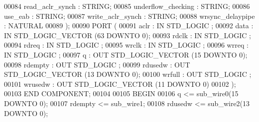 \begin{DoxyCode}
{00084         read\_aclr\_synch     : \textcolor{comment}{STRING};
00085         underflow\_checking      : \textcolor{comment}{STRING};
00086         use\_eab     : \textcolor{comment}{STRING};
00087         write\_aclr\_synch        : \textcolor{comment}{STRING};
00088         wrsync\_delaypipe        : \textcolor{comment}{NATURAL}
00089     );
00090     \textcolor{keywordflow}{PORT} (
00091             aclr    : \textcolor{keywordflow}{IN} \textcolor{comment}{STD\_LOGIC} ;
00092             data    : \textcolor{keywordflow}{IN} \textcolor{comment}{STD\_LOGIC\_VECTOR} (\textcolor{vhdllogic}{}\textcolor{vhdllogic}{63} \textcolor{keywordflow}{DOWNTO} \textcolor{vhdllogic}{}\textcolor{vhdllogic}{0});
00093             rdclk   : \textcolor{keywordflow}{IN} \textcolor{comment}{STD\_LOGIC} ;
00094             rdreq   : \textcolor{keywordflow}{IN} \textcolor{comment}{STD\_LOGIC} ;
00095             wrclk   : \textcolor{keywordflow}{IN} \textcolor{comment}{STD\_LOGIC} ;
00096             wrreq   : \textcolor{keywordflow}{IN} \textcolor{comment}{STD\_LOGIC} ;
00097             q   : \textcolor{keywordflow}{OUT} \textcolor{comment}{STD\_LOGIC\_VECTOR} (\textcolor{vhdllogic}{}\textcolor{vhdllogic}{15} \textcolor{keywordflow}{DOWNTO} \textcolor{vhdllogic}{}\textcolor{vhdllogic}{0});
00098             rdempty : \textcolor{keywordflow}{OUT} \textcolor{comment}{STD\_LOGIC} ;
00099             rdusedw : \textcolor{keywordflow}{OUT} \textcolor{comment}{STD\_LOGIC\_VECTOR} (\textcolor{vhdllogic}{}\textcolor{vhdllogic}{13} \textcolor{keywordflow}{DOWNTO} \textcolor{vhdllogic}{}\textcolor{vhdllogic}{0});
00100             wrfull  : \textcolor{keywordflow}{OUT} \textcolor{comment}{STD\_LOGIC} ;
00101             wrusedw : \textcolor{keywordflow}{OUT} \textcolor{comment}{STD\_LOGIC\_VECTOR} (\textcolor{vhdllogic}{}\textcolor{vhdllogic}{11} \textcolor{keywordflow}{DOWNTO} \textcolor{vhdllogic}{}\textcolor{vhdllogic}{0})
00102     );
00103     \textcolor{keywordflow}{END} \textcolor{keywordflow}{COMPONENT};
00104 
00105 \textcolor{vhdlkeyword}{BEGIN}
00106     \textcolor{vhdlchar}{q}    \textcolor{vhdlchar}{<=} \textcolor{vhdlchar}{sub_wire0}\textcolor{vhdlchar}{(}\textcolor{vhdllogic}{}\textcolor{vhdllogic}{15} \textcolor{keywordflow}{DOWNTO} \textcolor{vhdllogic}{}\textcolor{vhdllogic}{0}\textcolor{vhdlchar}{)};
00107     \textcolor{vhdlchar}{rdempty}    \textcolor{vhdlchar}{<=} \textcolor{vhdlchar}{sub_wire1};
00108     \textcolor{vhdlchar}{rdusedw}    \textcolor{vhdlchar}{<=} \textcolor{vhdlchar}{sub_wire2}\textcolor{vhdlchar}{(}\textcolor{vhdllogic}{}\textcolor{vhdllogic}{13} \textcolor{keywordflow}{DOWNTO} \textcolor{vhdllogic}{}\textcolor{vhdllogic}{0}\textcolor{vhdlchar}{)};
}
\end{DoxyCode}
